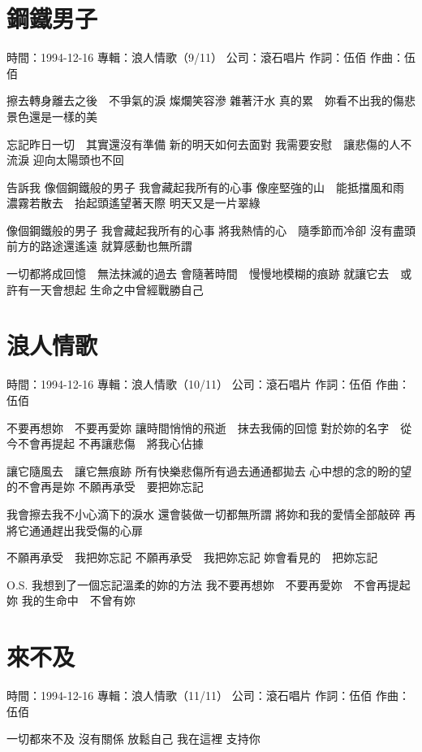 \documentclass[UTF8,a4paper,oneside,twocolumn,12pt]{ctexbook}
\newcommand{\infopair}[2]{\textbullet #1：#2}
\newcommand{\zc}[1][伍佰]{\infopair{作詞}{#1}}
\newcommand{\zq}[1][伍佰]{\infopair{作曲}{#1}}
\newcommand{\zj}[1]{\infopair{專輯}{#1}}
\newcommand{\sj}[1]{\infopair{時間}{#1}}
\newcommand{\gs}[1]{\infopair{公司}{#1}}
\newenvironment{info}{\begin{flushleft}\kaishu
	}
	{\end{flushleft}\normalsize\yahei\par}
\newenvironment{lyric}{
	}
{}
\begin{document}
\section{鋼鐵男子}
\begin{info}
	\sj{1994-12-16}
	\zj{浪人情歌（9/11）}
	\gs{滾石唱片}
	\zc
	\zq
\end{info}
\begin{lyric}
	擦去轉身離去之後　不爭氣的淚
	燦爛笑容滲 雜著汗水
	真的累　妳看不出我的傷悲
	景色還是一樣的美

	忘記昨日一切　其實還沒有準備
	新的明天如何去面對
	我需要安慰　讓悲傷的人不流淚
	迎向太陽頭也不回

	告訴我
	像個鋼鐵般的男子
	我會藏起我所有的心事
	像座堅強的山　能抵擋風和雨
	濃霧若散去　抬起頭遙望著天際
	明天又是一片翠綠

	像個鋼鐵般的男子
	我會藏起我所有的心事
	將我熱情的心　隨季節而冷卻
	沒有盡頭　前方的路途還遙遠
	就算感動也無所謂

	一切都將成回憶　無法抹滅的過去
	會隨著時間　慢慢地模糊的痕跡
	就讓它去　或許有一天會想起
	生命之中曾經戰勝自己
\end{lyric}

\section{浪人情歌}
\begin{info}
	\sj{1994-12-16}
	\zj{浪人情歌（10/11）}
	\gs{滾石唱片}
	\zc
	\zq
\end{info}
\begin{lyric}
	不要再想妳　不要再愛妳
	讓時間悄悄的飛逝　抹去我倆的回憶
	對於妳的名字　從今不會再提起
	不再讓悲傷　將我心佔據

	讓它隨風去　讓它無痕跡
	所有快樂悲傷所有過去通通都拋去
	心中想的念的盼的望的不會再是妳
	不願再承受　要把妳忘記

	我會擦去我不小心滴下的淚水
	還會裝做一切都無所謂
	將妳和我的愛情全部敲碎
	再將它通通趕出我受傷的心扉

	不願再承受　我把妳忘記
	不願再承受　我把妳忘記
	妳會看見的　把妳忘記

	O.S. 我想到了一個忘記溫柔的妳的方法
	我不要再想妳　不要再愛妳　不會再提起妳
	我的生命中　不曾有妳
\end{lyric}

\section{來不及}
\begin{info}
	\sj{1994-12-16}
	\zj{浪人情歌（11/11）}
	\gs{滾石唱片}
	\zc
	\zq
\end{info}
\begin{lyric}
	一切都來不及
	沒有關係
	放鬆自己
	我在這裡
	支持你
\end{lyric}
\end{document}
